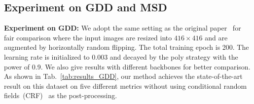 \subsection{Experiment on GDD and MSD}
\noindent \textbf{Experiment on GDD:} We adopt the same setting as the original paper~\cite{tranparent_gdnet} for fair comparison where the input images are resized into $416 \times 416$ and are augmented by horizontally random flipping. The total training epoch is 200. The learning rate is initialized to 0.003 and decayed by the poly strategy with the power of 0.9. We also give results with different backbones for better comparison. As shown in Tab.~\ref{tab:results_GDD}, our method achieves the state-of-the-art result on this dataset on five different metrics without using conditional random fields~(CRF)~\cite{CRF} as the post-processing.


